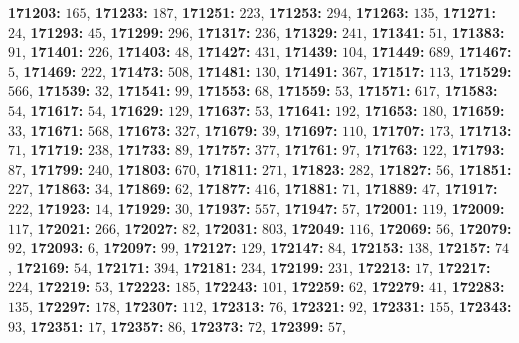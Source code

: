 \textsf{\bfseries 171203:} $165$, \textsf{\bfseries 171233:} $187$, \textsf{\bfseries 171251:} $223$, \textsf{\bfseries 171253:} $294$, \textsf{\bfseries 171263:} $135$, \textsf{\bfseries 171271:} $24$, \textsf{\bfseries 171293:} $45$, \textsf{\bfseries 171299:} $296$, \textsf{\bfseries 171317:} $236$, \textsf{\bfseries 171329:} $241$, \textsf{\bfseries 171341:} $51$, \textsf{\bfseries 171383:} $91$, \textsf{\bfseries 171401:} $226$, \textsf{\bfseries 171403:} $48$, \textsf{\bfseries 171427:} $431$, \textsf{\bfseries 171439:} $104$, \textsf{\bfseries 171449:} $689$, \textsf{\bfseries 171467:} $5$, \textsf{\bfseries 171469:} $222$, \textsf{\bfseries 171473:} $508$, \textsf{\bfseries 171481:} $130$, \textsf{\bfseries 171491:} $367$, \textsf{\bfseries 171517:} $113$, \textsf{\bfseries 171529:} $566$, \textsf{\bfseries 171539:} $32$, \textsf{\bfseries 171541:} $99$, \textsf{\bfseries 171553:} $68$, \textsf{\bfseries 171559:} $53$, \textsf{\bfseries 171571:} $617$, \textsf{\bfseries 171583:} $54$, \textsf{\bfseries 171617:} $54$, \textsf{\bfseries 171629:} $129$, \textsf{\bfseries 171637:} $53$, \textsf{\bfseries 171641:} $192$, \textsf{\bfseries 171653:} $180$, \textsf{\bfseries 171659:} $33$, \textsf{\bfseries 171671:} $568$, \textsf{\bfseries 171673:} $327$, \textsf{\bfseries 171679:} $39$, \textsf{\bfseries 171697:} $110$, \textsf{\bfseries 171707:} $173$, \textsf{\bfseries 171713:} $71$, \textsf{\bfseries 171719:} $238$, \textsf{\bfseries 171733:} $89$, \textsf{\bfseries 171757:} $377$, \textsf{\bfseries 171761:} $97$, \textsf{\bfseries 171763:} $122$, \textsf{\bfseries 171793:} $87$, \textsf{\bfseries 171799:} $240$, \textsf{\bfseries 171803:} $670$, \textsf{\bfseries 171811:} $271$, \textsf{\bfseries 171823:} $282$, \textsf{\bfseries 171827:} $56$, \textsf{\bfseries 171851:} $227$, \textsf{\bfseries 171863:} $34$, \textsf{\bfseries 171869:} $62$, \textsf{\bfseries 171877:} $416$, \textsf{\bfseries 171881:} $71$, \textsf{\bfseries 171889:} $47$, \textsf{\bfseries 171917:} $222$, \textsf{\bfseries 171923:} $14$, \textsf{\bfseries 171929:} $30$, \textsf{\bfseries 171937:} $557$, \textsf{\bfseries 171947:} $57$, \textsf{\bfseries 172001:} $119$, \textsf{\bfseries 172009:} $117$, \textsf{\bfseries 172021:} $266$, \textsf{\bfseries 172027:} $82$, \textsf{\bfseries 172031:} $803$, \textsf{\bfseries 172049:} $116$, \textsf{\bfseries 172069:} $56$, \textsf{\bfseries 172079:} $92$, \textsf{\bfseries 172093:} $6$, \textsf{\bfseries 172097:} $99$, \textsf{\bfseries 172127:} $129$, \textsf{\bfseries 172147:} $84$, \textsf{\bfseries 172153:} $138$, \textsf{\bfseries 172157:} $74$, \textsf{\bfseries 172169:} $54$, \textsf{\bfseries 172171:} $394$, \textsf{\bfseries 172181:} $234$, \textsf{\bfseries 172199:} $231$, \textsf{\bfseries 172213:} $17$, \textsf{\bfseries 172217:} $224$, \textsf{\bfseries 172219:} $53$, \textsf{\bfseries 172223:} $185$, \textsf{\bfseries 172243:} $101$, \textsf{\bfseries 172259:} $62$, \textsf{\bfseries 172279:} $41$, \textsf{\bfseries 172283:} $135$, \textsf{\bfseries 172297:} $178$, \textsf{\bfseries 172307:} $112$, \textsf{\bfseries 172313:} $76$, \textsf{\bfseries 172321:} $92$, \textsf{\bfseries 172331:} $155$, \textsf{\bfseries 172343:} $93$, \textsf{\bfseries 172351:} $17$, \textsf{\bfseries 172357:} $86$, \textsf{\bfseries 172373:} $72$, \textsf{\bfseries 172399:} $57$, 
